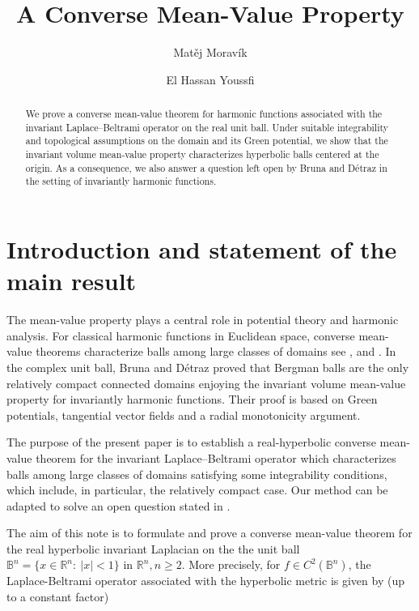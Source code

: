 \documentclass[12pt]{amsart}
\title{A Converse Mean-Value Property}
\author[M.~Moravík]{Matěj Moravík}
\author[E.H.~Youssfi]{El Hassan Youssfi}
\numberwithin{equation}{section}
\newcommand{\Bn}{\mathbb B^n}
\newcommand{\Rn}{\mathbb R^n}
\theoremstyle{plain}
\numberwithin{equation}{section}
\numberwithin{theorem}{section}
\numberwithin{proposition}{section}
\begin{document}
\maketitle


\begin{abstract}

We prove a converse mean-value theorem for harmonic functions associated with the invariant Laplace--Beltrami operator on the real unit ball. Under suitable integrability and topological assumptions on the domain and its Green potential, we show that the invariant volume mean-value property characterizes hyperbolic balls centered at the origin. As a consequence, we also answer a question left open by Bruna and D\'etraz in the setting of invariantly harmonic functions.
\end{abstract}


\section{Introduction and statement of the main result}

The mean-value property plays a central role in potential theory and harmonic analysis.
For classical harmonic functions in Euclidean space, converse mean-value theorems
characterize balls among large classes of domains see \cite{Ep}, \cite{Ku} and \cite{AG}. In the complex unit ball,
Bruna and D\'etraz \cite{BD} proved that Bergman balls are the only relatively compact
connected domains enjoying the invariant volume mean-value property for invariantly
harmonic functions. Their proof is based on Green potentials, tangential vector
fields and a radial monotonicity argument. 

The purpose of the present paper is to establish a real-hyperbolic converse mean-value theorem for
the invariant Laplace--Beltrami operator which characterizes balls among large classes of domains satisfying some integrability conditions, which include, in particular, the relatively compact case. 
Our method can be adapted to solve an open question stated in \cite{BD}.




The aim of this note is to formulate and prove a converse mean-value theorem
for the real hyperbolic invariant Laplacian on the the unit ball  $
\Bn=\{x\in\Rn:\ |x|<1\}$ in ${\mathbb R}^n, n\geq 2$.  More precisely, for $f \in C^{2}(\Bn)$, the Laplace-Beltrami operator associated with the hyperbolic metric is given by (up to a constant factor)
\end{document}
